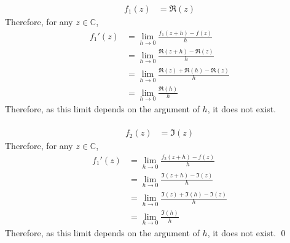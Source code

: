 \documentclass[fleqn, a4paper, 11pt, oneside]{amsart}
\theoremstyle{definition}
\theoremstyle{theorem}
\begin{document}
\begin{solution}
	\begin{align*}
		f_1(z) &= \Re(z)
	\end{align*}
	Therefore, for any $z \in \mathbb{C}$,
	\begin{align*}
		{f_1}'(z) &= \lim\limits_{h \to 0} \frac{f_1(z + h) - f(z)}{h}\\
		&= \lim\limits_{h \to 0} \frac{\Re(z + h) - \Re(z)}{h}\\
		&= \lim\limits_{h \to 0} \frac{\Re(z) + \Re(h) - \Re(z)}{h}\\
		&= \lim\limits_{h \to 0} \frac{\Re(h)}{h}
	\end{align*}
	Therefore, as this limit depends on the argument of $h$, it does not exist.\\
	~\\
	\begin{align*}
		f_2(z) &= \Im(z)
	\end{align*}
	Therefore, for any $z \in \mathbb{C}$,
	\begin{align*}
		{f_1}'(z) &= \lim\limits_{h \to 0} \frac{f_2(z + h) - f(z)}{h}\\
		&= \lim\limits_{h \to 0} \frac{\Im(z + h) - \Im(z)}{h}\\
		&= \lim\limits_{h \to 0} \frac{\Im(z) + \Im(h) - \Im(z)}{h}\\
		&= \lim\limits_{h \to 0} \frac{\Im(h)}{h}
	\end{align*}
	Therefore, as this limit depends on the argument of $h$, it does not exist.
	\qed
\end{solution}
\end{document}
